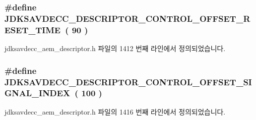 \subsubsection[{\texorpdfstring{J\+D\+K\+S\+A\+V\+D\+E\+C\+C\+\_\+\+D\+E\+S\+C\+R\+I\+P\+T\+O\+R\+\_\+\+C\+O\+N\+T\+R\+O\+L\+\_\+\+O\+F\+F\+S\+E\+T\+\_\+\+R\+E\+S\+E\+T\+\_\+\+T\+I\+ME}{JDKSAVDECC_DESCRIPTOR_CONTROL_OFFSET_RESET_TIME}}]{\setlength{\rightskip}{0pt plus 5cm}\#define J\+D\+K\+S\+A\+V\+D\+E\+C\+C\+\_\+\+D\+E\+S\+C\+R\+I\+P\+T\+O\+R\+\_\+\+C\+O\+N\+T\+R\+O\+L\+\_\+\+O\+F\+F\+S\+E\+T\+\_\+\+R\+E\+S\+E\+T\+\_\+\+T\+I\+ME~( 90 )}\hypertarget{group__descriptor__control_ga96ec4992318ff38004b5ed502dbfa7a1}{}\label{group__descriptor__control_ga96ec4992318ff38004b5ed502dbfa7a1}


jdksavdecc\+\_\+aem\+\_\+descriptor.\+h 파일의 1412 번째 라인에서 정의되었습니다.

\subsubsection[{\texorpdfstring{J\+D\+K\+S\+A\+V\+D\+E\+C\+C\+\_\+\+D\+E\+S\+C\+R\+I\+P\+T\+O\+R\+\_\+\+C\+O\+N\+T\+R\+O\+L\+\_\+\+O\+F\+F\+S\+E\+T\+\_\+\+S\+I\+G\+N\+A\+L\+\_\+\+I\+N\+D\+EX}{JDKSAVDECC_DESCRIPTOR_CONTROL_OFFSET_SIGNAL_INDEX}}]{\setlength{\rightskip}{0pt plus 5cm}\#define J\+D\+K\+S\+A\+V\+D\+E\+C\+C\+\_\+\+D\+E\+S\+C\+R\+I\+P\+T\+O\+R\+\_\+\+C\+O\+N\+T\+R\+O\+L\+\_\+\+O\+F\+F\+S\+E\+T\+\_\+\+S\+I\+G\+N\+A\+L\+\_\+\+I\+N\+D\+EX~( 100 )}\hypertarget{group__descriptor__control_ga4f1c188b79a1c18fbdc1cd27bfd8bd21}{}\label{group__descriptor__control_ga4f1c188b79a1c18fbdc1cd27bfd8bd21}


jdksavdecc\+\_\+aem\+\_\+descriptor.\+h 파일의 1416 번째 라인에서 정의되었습니다.


